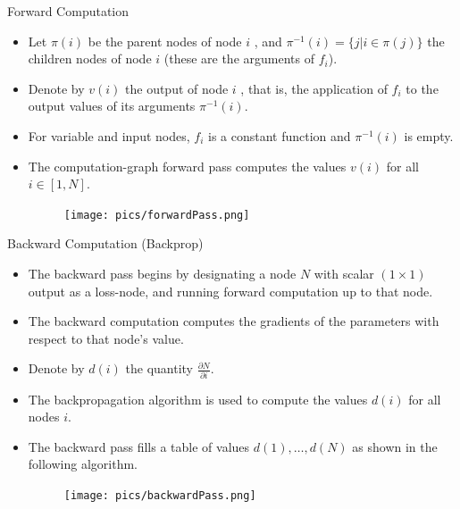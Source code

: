 \documentclass[handout]{beamer}
\begin{document}
\begin{frame}{Forward Computation}
\begin{scriptsize}
\begin{itemize}

\item Let $\pi(i)$ be the parent nodes of node $i$ , and $\pi^{-1}(i) = \{j| i \in \pi(j) \}$ the children nodes of node $i$ (these are the arguments of $f_i$).

\item Denote by $v(i)$  the output of node $i$ , that is, the application of $f_i$ to the output values of its arguments $\pi^{-1}(i)$. 

\item For variable and input nodes, $f_i$ is a constant function and $\pi^{-1}(i)$ is empty. 

\item The computation-graph forward pass computes the values $v(i)$ for all $i \in [1,N]$.

 \begin{figure}[htb]
	\centering
	 \texttt{[image: pics/forwardPass.png]}
\end{figure}

\end{itemize}
\end{scriptsize}
\end{frame}



\begin{frame}{Backward Computation (Backprop)}
\begin{scriptsize}
\begin{itemize}

\item The backward pass begins by designating a node $N$ with scalar $(1\times1)$ output as a loss-node, and running forward computation up to that node.

\item The backward computation computes the gradients of the parameters with respect to that node's value.


\item Denote by $d(i)$  the quantity $\frac{\partial N}{ \partial i}$.

\item The backpropagation algorithm is used to compute the values $d(i)$  for all nodes $i$.

\item The backward pass fills a table of values $d(1), \dots, d(N)$  as shown in the following algorithm.

 \begin{figure}[htb]
	\centering
	 \texttt{[image: pics/backwardPass.png]}
\end{figure}

\end{itemize}
\end{scriptsize}
\end{frame}
\end{document}
